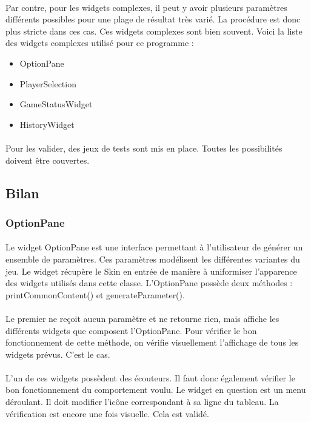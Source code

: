 \documentclass[11pt]{article} %
\begin{document}
\paragraph{}
Par contre, pour les widgets complexes, il peut y avoir plusieurs paramètres différents possibles pour une plage de résultat très varié. La procédure est donc plus stricte dans ces cas. Ces widgets complexes sont bien souvent. Voici la liste des widgets complexes utilisé pour ce programme :
\begin{itemize}
\item OptionPane
\item PlayerSelection
\item GameStatusWidget
\item HistoryWidget
\end{itemize}
\paragraph{}
Pour les valider, des jeux de tests sont mis en place. Toutes les possibilités doivent être couvertes.

\subsection{Bilan}
\subsubsection{OptionPane}
\paragraph{}
Le widget OptionPane est une interface permettant à l'utilisateur de générer un ensemble de paramètres. Ces paramètres modélisent les différentes variantes du jeu. Le widget récupère le Skin en entrée de manière à uniformiser l'apparence des widgets utilisés dans cette classe. L'OptionPane possède deux méthodes : printCommonContent() et generateParameter().
\paragraph{}
Le premier ne reçoit aucun paramètre et ne retourne rien, mais affiche les différents widgets que composent l'OptionPane. Pour vérifier le bon fonctionnement de cette méthode, on vérifie visuellement l'affichage de tous les widgets prévus. C'est le cas.
\paragraph{} 
L'un de ces widgets possèdent des écouteurs. Il faut donc également vérifier le bon fonctionnement du comportement voulu. Le widget en question est un menu déroulant. Il doit modifier l’icône correspondant à sa ligne du tableau. La vérification est encore une fois visuelle. Cela est validé.
\end{document}
